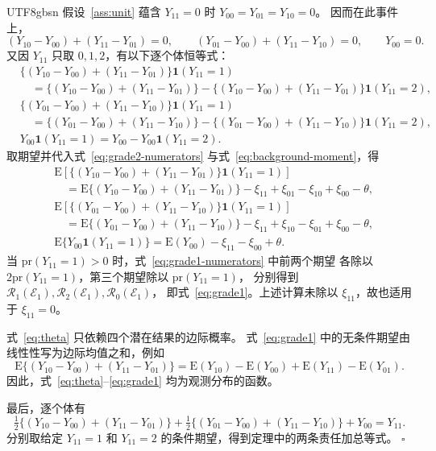 \documentclass[11pt,a4paper]{article}
\theoremstyle{report}
\begin{document}
\begin{CJK*}{UTF8}{gbsn}
\clearpage
假设~\ref{ass:unit} 蕴含 $Y_{11}=0$ 时 $Y_{00}=Y_{01}=Y_{10}=0$。
因而在此事件上，
\[
(Y_{10}-Y_{00})+(Y_{11}-Y_{01})=0,\qquad
(Y_{01}-Y_{00})+(Y_{11}-Y_{10})=0,\qquad Y_{00}=0.
\]
又因 $Y_{11}$ 只取 $0,1,2$，有以下逐个体恒等式：
\begin{equation}
\begin{aligned}
&\{(Y_{10}-Y_{00})+(Y_{11}-Y_{01})\}\mathbf1(Y_{11}=1)\\
&\quad=\{(Y_{10}-Y_{00})+(Y_{11}-Y_{01})\}
       -\{(Y_{10}-Y_{00})+(Y_{11}-Y_{01})\}\mathbf1(Y_{11}=2),\\[4pt]
&\{(Y_{01}-Y_{00})+(Y_{11}-Y_{10})\}\mathbf1(Y_{11}=1)\\
&\quad=\{(Y_{01}-Y_{00})+(Y_{11}-Y_{10})\}
       -\{(Y_{01}-Y_{00})+(Y_{11}-Y_{10})\}\mathbf1(Y_{11}=2),\\[4pt]
&Y_{00}\mathbf1(Y_{11}=1)=Y_{00}-Y_{00}\mathbf1(Y_{11}=2).
\end{aligned}
\label{eq:grade1-decomposition}
\end{equation}
取期望并代入式~\eqref{eq:grade2-numerators} 与式~\eqref{eq:background-moment}，得
\begin{equation}
\begin{aligned}
&\mathrm E\!\left[\{(Y_{10}-Y_{00})+(Y_{11}-Y_{01})\}
                       \mathbf1(Y_{11}=1)\right]\\
&\quad=\mathrm E\{(Y_{10}-Y_{00})+(Y_{11}-Y_{01})\}
       -\xi_{11}+\xi_{01}-\xi_{10}+\xi_{00}-\theta,\\[4pt]
&\mathrm E\!\left[\{(Y_{01}-Y_{00})+(Y_{11}-Y_{10})\}
                       \mathbf1(Y_{11}=1)\right]\\
&\quad=\mathrm E\{(Y_{01}-Y_{00})+(Y_{11}-Y_{10})\}
       -\xi_{11}+\xi_{10}-\xi_{01}+\xi_{00}-\theta,\\[4pt]
&\mathrm E\{Y_{00}\mathbf1(Y_{11}=1)\}
   =\mathrm E(Y_{00})-\xi_{11}-\xi_{00}+\theta.
\end{aligned}
\label{eq:grade1-numerators}
\end{equation}
当 $\mathrm{pr}(Y_{11}=1)>0$ 时，式~\eqref{eq:grade1-numerators} 中前两个期望
各除以 $2\mathrm{pr}(Y_{11}=1)$，第三个期望除以 $\mathrm{pr}(Y_{11}=1)$，
分别得到 $\mathcal R_1(\mathcal E_1),\mathcal R_2(\mathcal E_1),\mathcal R_0(\mathcal E_1)$，
即式~\eqref{eq:grade1}。上述计算未除以 $\xi_{11}$，故也适用于 $\xi_{11}=0$。

式~\eqref{eq:theta} 只依赖四个潜在结果的边际概率。
式~\eqref{eq:grade1} 中的无条件期望由线性性写为边际均值之和，例如
\[
\mathrm E\{(Y_{10}-Y_{00})+(Y_{11}-Y_{01})\}
=\mathrm E(Y_{10})-\mathrm E(Y_{00})+\mathrm E(Y_{11})-\mathrm E(Y_{01}).
\]
因此，式~\eqref{eq:theta}--\eqref{eq:grade1} 均为观测分布的函数。

最后，逐个体有
\[
\tfrac12\{(Y_{10}-Y_{00})+(Y_{11}-Y_{01})\}
+\tfrac12\{(Y_{01}-Y_{00})+(Y_{11}-Y_{10})\}
+Y_{00}=Y_{11}.
\]
分别取给定 $Y_{11}=1$ 和 $Y_{11}=2$ 的条件期望，得到定理中的两条责任加总等式。
\hfill$\square$

\ifPDFTeX\end{CJK*}\fi
\end{document}
